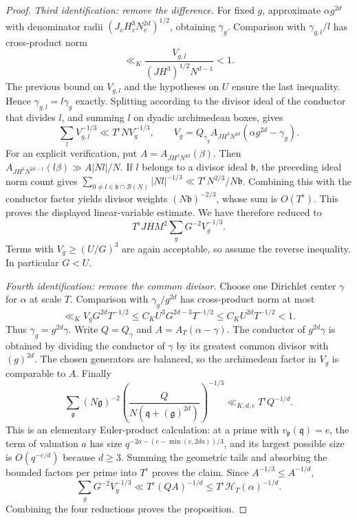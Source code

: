 \documentclass[11pt]{amsart}
\theoremstyle{definition}
\numberwithin{equation}{section}
\begin{document}
\begin{proof}
\emph{Third identification: remove the difference.}
For fixed $g$, approximate $\alpha g^{2d}$ with denominator radii
$(J_vH_v^3N_v^{2d})^{1/2}$, obtaining $\gamma_g$.
Comparison with $\gamma_{g,l}/l$ has cross-product norm
\[
 \ll_K\frac{V_{g,l}}{(JH^3)^{1/2}N^{d-1}}<1.
\]
The previous bound on $V_{g,l}$ and the hypotheses on $U$ ensure the last
inequality.  Hence $\gamma_{g,l}=l\gamma_g$ exactly.
Splitting according to the divisor ideal of the conductor that divides $l$,
and summing $l$ on dyadic archimedean boxes, gives
\[
 \sum_l V_{g,l}^{-1/3}\ll T^\epsilon N V_g^{-1/3},\qquad
 V_g=Q_{\gamma_g}A_{JH^3N^{2d}}(\alpha g^{2d}-\gamma_g).
\]
For an explicit verification, put $A=A_{JH^3N^{2d}}(\beta)$.
Then $A_{JH^3N^{2d-1}}(l\beta)\gg A|Nl|/N$.
If $l$ belongs to a divisor ideal $\mathfrak b$, the preceding ideal norm
count gives
$\sum_{0\ne l\in\mathfrak b\cap\mathcal B(N)}|Nl|^{-1/3}
\ll T^\epsilon N^{2/3}/N\mathfrak b$.
Combining this with the conductor factor yields divisor weights
$(N\mathfrak b)^{-2/3}$, whose sum is $O(T^\epsilon)$.
This proves the displayed linear-variable estimate.
We have therefore reduced to
\[
 T^\epsilon JHM^2\sum_gG^{-2}V_g^{-1/3}.
\]
Terms with $V_g\ge(U/G)^3$ are again acceptable, so assume the reverse
inequality.  In particular $G<U$.

\emph{Fourth identification: remove the common divisor.}
Choose one Dirichlet center $\gamma$ for $\alpha$ at scale $T$.
Comparison with $\gamma_g/g^{2d}$ has cross-product norm at most
\[
 \ll_K V_gG^{2d}T^{-1/2}
 \le C_KU^3G^{2d-3}T^{-1/2}
 \le C_KU^{2d}T^{-1/2}<1.
\]
Thus $\gamma_g=g^{2d}\gamma$.  Write $Q=Q_\gamma$ and $A=A_T(\alpha-\gamma)$.
The conductor of $g^{2d}\gamma$ is obtained by dividing the conductor of
$\gamma$ by its greatest common divisor with $(g)^{2d}$.
The chosen generators are balanced, so the archimedean factor in $V_g$
is comparable to $A$.
Finally
\[
 \sum_{\mathfrak g}(N\mathfrak g)^{-2}
 \left(\frac{Q}{N(\mathfrak q+(\mathfrak g)^{2d})}\right)^{-1/3}
 \ll_{K,d,\epsilon}T^\epsilon Q^{-1/d}.
\]
This is an elementary Euler-product calculation: at a prime with
$v_\mathfrak p(\mathfrak q)=e$, the term of valuation $a$ has size
$q^{-2a-(e-\min(e,2da))/3}$, and its largest possible size is
$O(q^{-e/d})$ because $d\ge3$.  Summing the geometric tails and absorbing
the bounded factors per prime into $T^\epsilon$ proves the claim.
Since $A^{-1/3}\le A^{-1/d}$,
\[
 \sum_gG^{-2}V_g^{-1/3}\ll T^\epsilon(QA)^{-1/d}
 \le T^\epsilon\mathcal H_T(\alpha)^{-1/d}.
\]
Combining the four reductions proves the proposition.
\end{proof}
\end{document}
